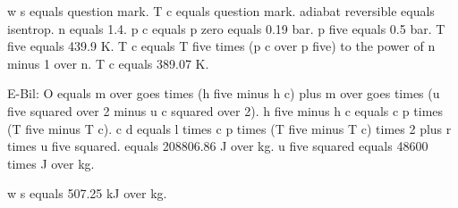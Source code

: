 w s equals question mark. T c equals question mark.
adiabat reversible equals isentrop. n equals 1.4.
p c equals p zero equals 0.19 bar. p five equals 0.5 bar. T five equals 439.9 K.
T c equals T five times (p c over p five) to the power of n minus 1 over n.
T c equals 389.07 K.

E-Bil: O equals m over goes times (h five minus h c) plus m over goes times (u five squared over 2 minus u c squared over 2).
h five minus h c equals c p times (T five minus T c).
c d equals l times c p times (T five minus T c) times 2 plus r times u five squared.
equals 208806.86 J over kg.
u five squared equals 48600 times J over kg.

w s equals 507.25 kJ over kg.